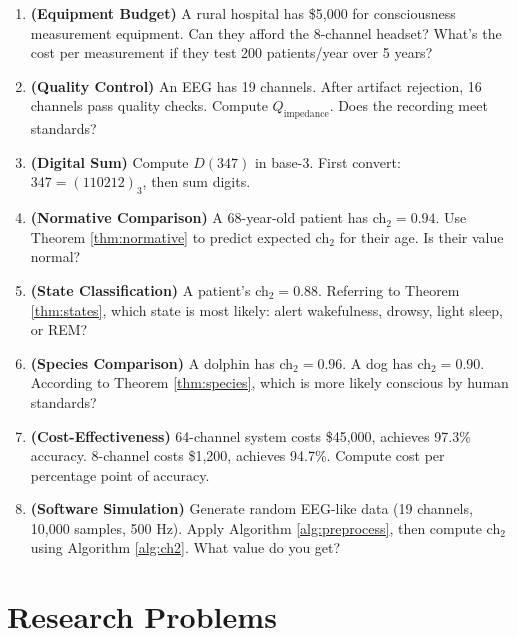 \begin{enumerate}
\item \textbf{(Equipment Budget)} A rural hospital has \$5,000 for consciousness measurement equipment. Can they afford the 8-channel headset? What's the cost per measurement if they test 200 patients/year over 5 years?

\item \textbf{(Quality Control)} An EEG has 19 channels. After artifact rejection, 16 channels pass quality checks. Compute $Q_{\text{impedance}}$. Does the recording meet standards?

\item \textbf{(Digital Sum)} Compute $D(347)$ in base-3. First convert: $347 = (110212)_3$, then sum digits.

\item \textbf{(Normative Comparison)} A 68-year-old patient has ch$_2 = 0.94$. Use Theorem \ref{thm:normative} to predict expected ch$_2$ for their age. Is their value normal?

\item \textbf{(State Classification)} A patient's ch$_2 = 0.88$. Referring to Theorem \ref{thm:states}, which state is most likely: alert wakefulness, drowsy, light sleep, or REM?

\item \textbf{(Species Comparison)} A dolphin has ch$_2 = 0.96$. A dog has ch$_2 = 0.90$. According to Theorem \ref{thm:species}, which is more likely conscious by human standards?

\item \textbf{(Cost-Effectiveness)} 64-channel system costs \$45,000, achieves 97.3\% accuracy. 8-channel costs \$1,200, achieves 94.7\%. Compute cost per percentage point of accuracy.

\item \textbf{(Software Simulation)} Generate random EEG-like data (19 channels, 10,000 samples, 500 Hz). Apply Algorithm \ref{alg:preprocess}, then compute ch$_2$ using Algorithm \ref{alg:ch2}. What value do you get?
\end{enumerate}

\section*{Research Problems}

